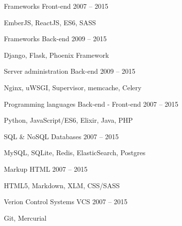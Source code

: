 \begin{cventries}
  \cventry
    {Frameworks}
    {Front-end}
    {}
    {2007 – 2015}
    {
      \begin{cvitems}
        \item {EmberJS, ReactJS, ES6, SASS}
      \end{cvitems}
    }
  \cventry
    {Frameworks}
    {Back-end}
    {}
    {2009 – 2015}
    {
      \begin{cvitems}
        \item {Django, Flask, Phoenix Framework}
      \end{cvitems}
    }
  \cventry
    {Server administration}
    {Back-end}
    {}
    {2009 – 2015}
    {
      \begin{cvitems}
        \item {Nginx, uWSGI, Supervisor, memcache, Celery}
      \end{cvitems}
    }
  \cventry
    {Programming languages}
    {Back-end - Front-end}
    {}
    {2007 – 2015}
    {
      \begin{cvitems}
        \item {Python, JavaScript/ES6, Elixir, Java, PHP}
      \end{cvitems}
    }
  \cventry
    {SQL \& NoSQL}
    {Databases}
    {}
    {2007 – 2015}
    {
      \begin{cvitems}
        \item {MySQL, SQLite, Redis, ElasticSearch, Postgres}
      \end{cvitems}
    }
  \cventry
    {Markup}
    {HTML}
    {}
    {2007 – 2015}
    {
      \begin{cvitems}
        \item {HTML5, Markdown, XLM, CSS/SASS}
      \end{cvitems}
    }
  \cventry
    {Verion Control Systems}
    {VCS}
    {}
    {2007 – 2015}
    {
      \begin{cvitems}
        \item {Git, Mercurial}
      \end{cvitems}
    }
\end{cventries}
